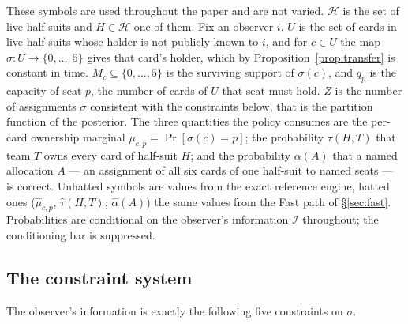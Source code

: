 \documentclass[11pt]{article}
\theoremstyle{definition}
\begin{document}
These symbols are used throughout the paper and are not varied. $\mathcal{H}$
is the set of live half-suits and $H \in \mathcal{H}$ one of them. Fix an
observer $i$. $U$ is the set of cards in live half-suits whose holder is not
publicly known to $i$, and for $c \in U$ the map $\sigma : U \to
\{0,\dots,5\}$ gives that card's holder, which by
Proposition~\ref{prop:transfer} is constant in time. $M_c \subseteq
\{0,\dots,5\}$ is the surviving support of $\sigma(c)$, and $q_p$ is the
capacity of seat $p$, the number of cards of $U$ that seat must hold. $Z$ is
the number of assignments $\sigma$ consistent with the constraints below, that
is the partition function of the posterior. The three quantities the policy
consumes are the per-card ownership marginal $\mu_{c,p} = \Pr[\sigma(c) = p]$;
the probability $\tau(H,T)$ that team $T$ owns every card of half-suit $H$;
and the probability $\alpha(A)$ that a named allocation $A$ --- an assignment
of all six cards of one half-suit to named seats --- is correct. Unhatted
symbols are values from the exact reference engine, hatted ones
($\hat\mu_{c,p}$, $\hat\tau(H,T)$, $\hat\alpha(A)$) the same values from the
Fast path of \S\ref{sec:fast}. Probabilities are conditional on the observer's
information $\mathcal{I}$ throughout; the conditioning bar is suppressed.

\subsection{The constraint system}
\label{sec:constraints}

The observer's information is exactly the following five constraints on
$\sigma$.
\end{document}
